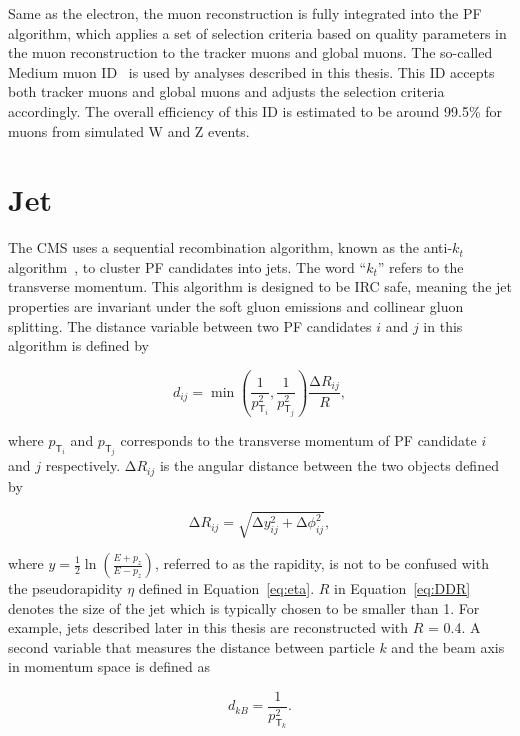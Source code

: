Same as the electron, the muon reconstruction is fully integrated into the \ac{PF} algorithm, which applies a set of selection criteria based on quality parameters in the muon reconstruction to the tracker muons and global muons. The so-called Medium muon ID~\cite{CMS:2018rym} is used by analyses described in this thesis. This ID accepts both tracker muons and global muons and adjusts the selection criteria accordingly. The overall efficiency of this ID is estimated to be around 99.5\% for muons from simulated W and Z events.

\section{Jet}
\label{sec:Jet}

The \ac{CMS} uses a sequential recombination algorithm, known as the anti-$k_t$ algorithm~\cite{Cacciari:2008gp}, to cluster \ac{PF} candidates into jets. The word ``$k_t$'' refers to the transverse momentum. This algorithm is designed to be \ac{IRC} safe, meaning the jet properties are invariant under the soft gluon emissions and collinear gluon splitting. The distance variable between two \ac{PF} candidates $i$ and $j$ in this algorithm is defined by 

\begin{equation}
\label{eq:ak}
d_{ij} = \min(\frac{1}{p_{\textsf{T}_i}^2},\frac{1}{p_{\textsf{T}_j}^2})\frac{\mathrm{\Delta}R_{ij}}{R},
\end{equation}

where $p_{\textsf{T}_i}$ and $p_{\textsf{T}_j}$ corresponds to the transverse momentum of \ac{PF} candidate $i$ and $j$ respectively. $\mathrm{\Delta}R_{ij}$ is the angular distance between the two objects defined by

\begin{equation}
\mathrm{\Delta}R_{ij} = \sqrt{\mathrm{\Delta}y_{ij}^2+\mathrm{\Delta}\phi_{ij}^2},
\label{eq:DDR}
\end{equation}

where $y=\frac{1}{2}\ln(\frac{E+p_z}{E-p_z})$, referred to as the rapidity, is not to be confused with the pseudorapidity $\eta$ defined in Equation~\ref{eq:eta}. $R$ in Equation~\ref{eq:DDR} denotes the size of the jet which is typically chosen to be smaller than 1. For example, jets described later in this thesis are reconstructed with $R$ = 0.4. A second variable that measures the distance between particle $k$ and the beam axis in momentum space is defined as 

\begin{equation}
d_{kB} = \frac{1}{p_{\textsf{T}_k}^2}.
\end{equation}

